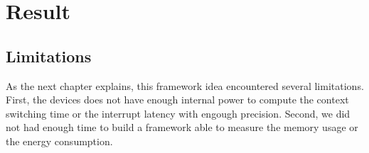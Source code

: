 \section{Result}

\subsection{Limitations}
As the next chapter explains, this framework idea encountered several limitations.
First, the devices does not have enough internal power to compute the context switching time or the interrupt latency with engough precision.
Second, we did not had enough time to build a framework able to measure the memory usage or the energy consumption.